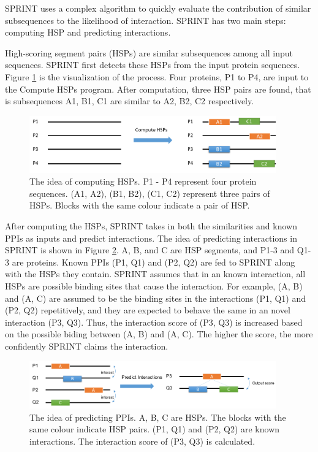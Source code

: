 SPRINT uses a complex algorithm to quickly evaluate the contribution of similar subsequences to the likelihood of interaction. SPRINT has two main steps: computing HSP and predicting interactions. 

High-scoring segment pairs (HSPs) are similar subsequences among all input sequences. SPRINT first detects these HSPs from the input protein sequences. Figure \ref{fig_compute_hsp} is the visualization of the process. Four proteins, P1 to P4, are input to the Compute HSPs program. After computation, three HSP pairs are found, that is  subsequences A1, B1, C1 are similar to A2, B2, C2 respectively.  

\begin{figure}
  \includegraphics[width=0.95\textwidth]{img/compute_hsp}
\caption[The idea of computing HSPs]{The idea of computing HSPs. P1 - P4 represent four protein sequences. (A1, A2), (B1, B2), (C1, C2) represent three pairs of HSPs. Blocks with the same colour indicate a pair of HSP.}
\label{fig_compute_hsp}  
\end{figure}

After computing the HSPs, SPRINT takes in both the similarities and known PPIs as inputs and predict interactions. The idea of predicting interactions in SPRINT is shown in Figure \ref{fig_predict_PPI}. A, B, and C are HSP segments, and P1-3 and Q1-3 are proteins. Known PPIs (P1, Q1) and (P2, Q2) are fed to SPRINT along with the HSPs they contain. SPRINT assumes that in an known interaction, all HSPs are possible binding sites that cause the interaction. For example, (A, B) and (A, C) are assumed to be the binding sites in the interactions (P1, Q1) and (P2, Q2) repetitively, and they are expected to behave the same in an novel interaction (P3, Q3). Thus, the interaction score of (P3, Q3) is increased based on the possible biding between (A, B) and (A, C). The higher the score, the more confidently SPRINT claims the interaction. 

\begin{figure}
  \includegraphics[width=0.95\textwidth]{img/predict_PPI.png}
\caption[The idea of predicting PPIs]{The idea of predicting PPIs. A, B, C are HSPs. The blocks with the same colour indicate HSP pairs. (P1, Q1) and (P2, Q2) are known interactions. The interaction score of (P3, Q3) is calculated.}
\label{fig_predict_PPI}  
\end{figure}

